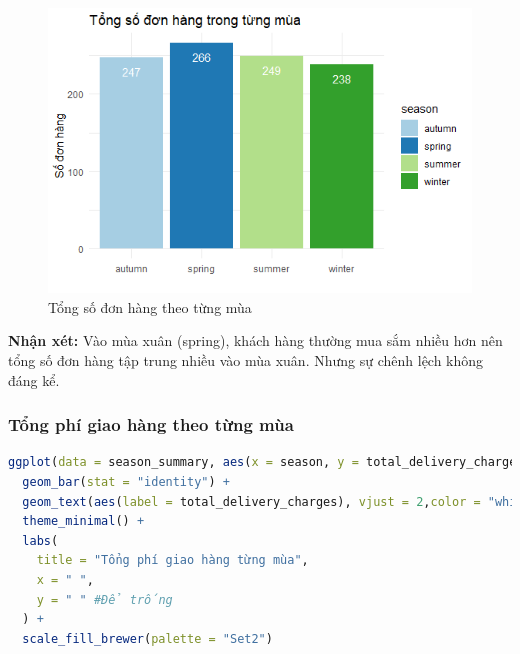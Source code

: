 \begin{figure}[!ht]
    \centering \includegraphics[width=15cm]{Images/img/4.3_plotting_data/1-total_order.png}
    \caption{Tổng số đơn hàng theo từng mùa}
    
\end{figure}
\begin{boxH}
\textbf{Nhận xét:} Vào mùa xuân (spring), khách hàng thường mua sắm nhiều hơn nên tổng số đơn hàng tập trung nhiều vào mùa xuân. Nhưng sự chênh lệch không đáng kể.
\end{boxH}
\subsubsection{Tổng phí giao hàng theo từng mùa}
\begin{lstlisting}[language=R, caption=Đồ thị Tổng chi phí giao hàng theo từng mùa]
ggplot(data = season_summary, aes(x = season, y = total_delivery_charges, fill = season)) +
  geom_bar(stat = "identity") +
  geom_text(aes(label = total_delivery_charges), vjust = 2,color = "white", ) +
  theme_minimal() +
  labs(
    title = "Tổng phí giao hàng từng mùa",
    x = " ",
    y = " " #Để trống
  ) +
  scale_fill_brewer(palette = "Set2")

\end{lstlisting}

